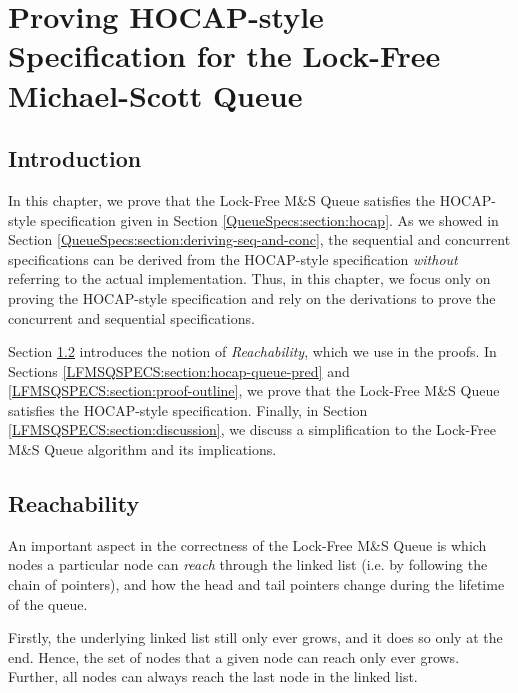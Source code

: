 \documentclass[a4paper, 10pt]{report}
\theoremstyle{definition}
\newcommand{\msq}{M\&S Queue}
\newcommand{\lfmsq}{Lock-Free \msq{}}
\begin{document}

\chapter{Proving HOCAP-style Specification for the Lock-Free Michael-Scott Queue}
\label{ch:LFMSQSPECS}

\section{Introduction}
\label{LFMSQSPECS:section:introduction}

In this chapter, we prove that the \lfmsq{} satisfies the HOCAP-style specification given in Section \ref{QueueSpecs:section:hocap}. As we showed in Section \ref{QueueSpecs:section:deriving-seq-and-conc}, the sequential and concurrent specifications can be derived from the HOCAP-style specification \emph{without} referring to the actual implementation. Thus, in this chapter, we focus only on proving the HOCAP-style specification and rely on the derivations to prove the concurrent and sequential specifications.

Section \ref{LFMSQSPECS:section:reachability} introduces the notion of \textit{Reachability}, which we use in the proofs. In Sections \ref{LFMSQSPECS:section:hocap-queue-pred} and \ref{LFMSQSPECS:section:proof-outline}, we prove that the \lfmsq{} satisfies the HOCAP-style specification. Finally, in Section \ref{LFMSQSPECS:section:discussion}, we discuss a simplification to the \lfmsq{} algorithm and its implications.

\section{Reachability}
\label{LFMSQSPECS:section:reachability}

An important aspect in the correctness of the \lfmsq{} is which nodes a particular node can \textit{reach} through the linked list (i.e. by following the chain of pointers), and how the head and tail pointers change during the lifetime of the queue.

Firstly, the underlying linked list still only ever grows, and it does so only at the end. Hence, the set of nodes that a given node can reach only ever grows. Further, all nodes can always reach the last node in the linked list.
\end{document}
